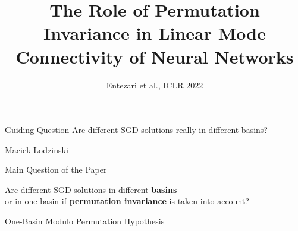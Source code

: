 \documentclass[aspectratio=169,11pt]{beamer}
\title{The Role of Permutation Invariance in Linear Mode Connectivity of Neural Networks}
\author{Entezari et al., ICLR 2022}
\date{}
\begin{document}
\begin{frame}
  \titlepage
  \vspace{-0.3cm}
  \begin{block}{Guiding Question}
    Are different SGD solutions really in different basins?
  \end{block}
  \vfill
  \begin{center}
    {\footnotesize Maciek Lodzinski}
  \end{center}
\end{frame}

\begin{frame}{Main Question of the Paper}

\centering
\Large
Are different SGD solutions in different \textbf{basins} --- \\
or in one basin if \textbf{permutation invariance} is taken into account?

\vspace{0.5cm}

\normalsize
\centering
One-Basin Modulo Permutation Hypothesis

\end{frame}
\end{document}
